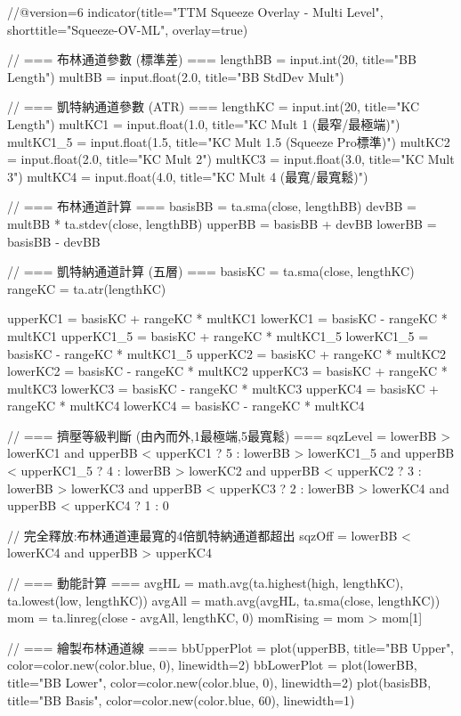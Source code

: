 //@version=6
indicator(title="TTM Squeeze Overlay - Multi Level", shorttitle="Squeeze-OV-ML", overlay=true)

// === 布林通道參數 (標準差) ===
lengthBB = input.int(20, title="BB Length")
multBB = input.float(2.0, title="BB StdDev Mult")

// === 凱特納通道參數 (ATR) ===
lengthKC = input.int(20, title="KC Length")
multKC1   = input.float(1.0, title="KC Mult 1 (最窄/最極端)")
multKC1_5 = input.float(1.5, title="KC Mult 1.5 (Squeeze Pro標準)")
multKC2   = input.float(2.0, title="KC Mult 2")
multKC3   = input.float(3.0, title="KC Mult 3")
multKC4   = input.float(4.0, title="KC Mult 4 (最寬/最寬鬆)")

// === 布林通道計算 ===
basisBB = ta.sma(close, lengthBB)
devBB = multBB * ta.stdev(close, lengthBB)
upperBB = basisBB + devBB
lowerBB = basisBB - devBB

// === 凱特納通道計算 (五層) ===
basisKC = ta.sma(close, lengthKC)
rangeKC = ta.atr(lengthKC)

upperKC1 = basisKC + rangeKC * multKC1
lowerKC1 = basisKC - rangeKC * multKC1
upperKC1_5 = basisKC + rangeKC * multKC1_5
lowerKC1_5 = basisKC - rangeKC * multKC1_5
upperKC2 = basisKC + rangeKC * multKC2
lowerKC2 = basisKC - rangeKC * multKC2
upperKC3 = basisKC + rangeKC * multKC3
lowerKC3 = basisKC - rangeKC * multKC3
upperKC4 = basisKC + rangeKC * multKC4
lowerKC4 = basisKC - rangeKC * multKC4

// === 擠壓等級判斷 (由內而外,1最極端,5最寬鬆) ===
sqzLevel = lowerBB > lowerKC1 and upperBB < upperKC1 ? 5 :
           lowerBB > lowerKC1_5 and upperBB < upperKC1_5 ? 4 :
           lowerBB > lowerKC2 and upperBB < upperKC2 ? 3 :
           lowerBB > lowerKC3 and upperBB < upperKC3 ? 2 :
           lowerBB > lowerKC4 and upperBB < upperKC4 ? 1 : 0

// 完全釋放:布林通道連最寬的4倍凱特納通道都超出
sqzOff = lowerBB < lowerKC4 and upperBB > upperKC4

// === 動能計算 ===
avgHL = math.avg(ta.highest(high, lengthKC), ta.lowest(low, lengthKC))
avgAll = math.avg(avgHL, ta.sma(close, lengthKC))
mom = ta.linreg(close - avgAll, lengthKC, 0)
momRising = mom > mom[1]

// === 繪製布林通道線 ===
bbUpperPlot = plot(upperBB, title="BB Upper", color=color.new(color.blue, 0), linewidth=2)
bbLowerPlot = plot(lowerBB, title="BB Lower", color=color.new(color.blue, 0), linewidth=2)
plot(basisBB, title="BB Basis", color=color.new(color.blue, 60), linewidth=1)

